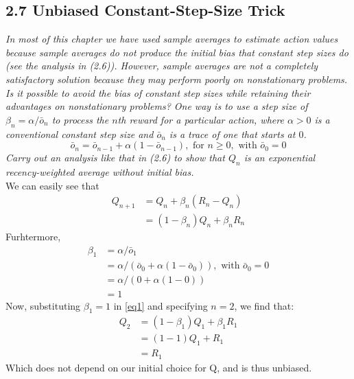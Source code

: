 \documentclass{article}
\begin{document}
\subsection{2.7 Unbiased Constant-Step-Size Trick}
\textit{In most of this chapter we have used sample averages to estimate action values because sample averages do not produce the initial bias that constant step sizes do (see the analysis in (2.6)). However, sample averages are not a completely satisfactory solution because they may perform poorly on nonstationary problems. Is it possible to avoid the bias of constant step sizes while retaining their advantages on nonstationary problems? One way is to use a step size of $\beta_n = \alpha / \bar{o}_n$ to process the $n$th reward for a particular action, where $\alpha > 0$ is a conventional constant step size and $\bar{o}_n$ is a trace of one that starts at $0$. }
\begin{equation}
\bar{o}_n = \bar{o}_{n-1} + \alpha(1-\bar{o}_{n-1}), \text{ for } n \geq 0, \text{ with } \bar{o}_0 = 0
\end{equation}
\textit{Carry out an analysis like that in (2.6) to show that $Q_n$ is an exponential recency-weighted average without initial bias.}
\\

We can easily see that 
\begin{align}
Q_{n+1} &= Q_n + \beta_n (R_n - Q_n) \\
&= (1 - \beta_n) Q_n + \beta_n R_n \label{eq1}
\end{align}
Furhtermore,
\begin{align}
\beta_1 &= \alpha / \bar{o}_1 \\
&= \alpha / (\bar{o}_0 + \alpha(1 - \bar{o}_0)), \text{ with } \bar{o}_0 = 0 \\
&= \alpha/(0 + \alpha(1-0)) \\
&= 1
\end{align}
Now, substituting $\beta_1 = 1$ in \ref{eq1} and specifying $n = 2$, we find that:
\begin{align}
Q_{2} &= (1 - \beta_1) Q_1 + \beta_1 R_1 \\
&= (1-1) Q_1 + R_1 \\
&= R_1
\end{align}
Which does not depend on our initial choice for Q, and is thus unbiased.
\end{document}
